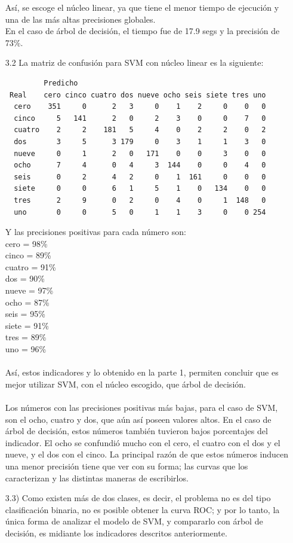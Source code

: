 \documentclass[11pt,a4paper]{report}
\begin{document}
\begin{itemize}
Así, se escoge el núcleo linear, ya que tiene el menor tiempo de ejecución y una de las más altas precisiones globales. \\
En el caso de árbol de decisión, el tiempo fue de 17.9 segs y la precisión de 73\%. 
\item[3.2] La matriz de confusión para SVM con núcleo linear es la siguiente:
\begin{verbatim}
         Predicho
 Real    cero cinco cuatro dos nueve ocho seis siete tres uno
  cero    351     0      2   3     0    1    2     0    0   0
  cinco     5   141      2   0     2    3    0     0    7   0
  cuatro    2     2    181   5     4    0    2     2    0   2
  dos       3     5      3 179     0    3    1     1    3   0
  nueve     0     1      2   0   171    0    0     3    0   0
  ocho      7     4      0   4     3  144    0     0    4   0
  seis      0     2      4   2     0    1  161     0    0   0
  siete     0     0      6   1     5    1    0   134    0   0
  tres      2     9      0   2     0    4    0     1  148   0
  uno       0     0      5   0     1    1    3     0    0 254
\end{verbatim}
Y las precisiones positivas para cada número son: \\
cero = 98\%\\
cinco = 89\%\\
cuatro = 91\%\\
dos = 90\%\\
nueve = 97\%\\
ocho = 87\%\\
seis = 95\%\\
siete = 91\%\\
tres = 89\%\\
uno = 96\%\\
\\
Así, estos indicadores y lo obtenido en la parte 1, permiten concluir que es mejor utilizar SVM, con el núcleo escogido, que árbol de decisión. \\ \\
Los números con las precisiones positivas más bajas, para el caso de SVM, son el ocho, cuatro y dos, que aún así poseen valores altos. En el caso de árbol de decisión, estos números también tuvieron bajos porcentajes del indicador. El ocho se confundió mucho con el cero, el cuatro con el dos y el nueve, y el dos con el cinco. La principal razón de que estos números inducen una menor precisión tiene que ver con su forma; las curvas que los caracterizan y las distintas maneras de escribirlos.
\item[3.3)] Como existen más de dos clases, es decir, el problema no es del tipo clasificación binaria, no es posible obtener la curva ROC; y por lo tanto, la única forma de analizar el modelo de SVM, y compararlo con árbol de decisión, es midiante los indicadores descritos anteriormente.


\end{itemize}
\end{document}
